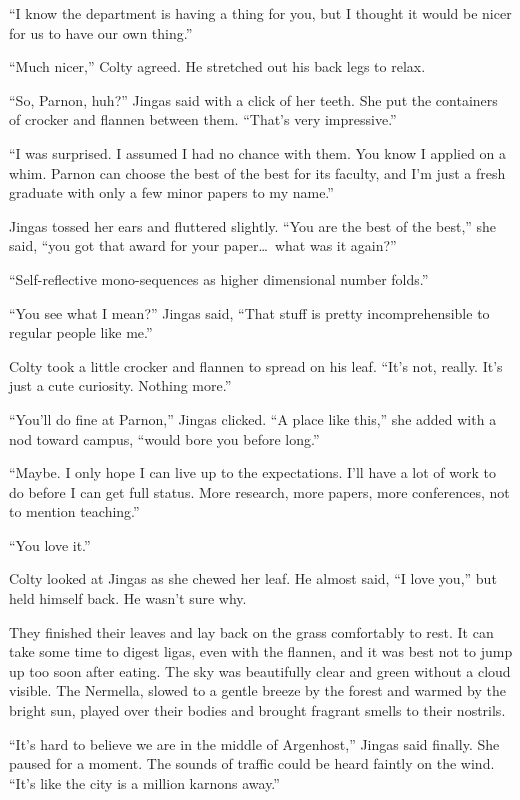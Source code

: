 ``I know the department is having a thing for you, but I thought it would be nicer for us to
have our own thing.''

``Much nicer,'' Colty agreed. He stretched out his back legs to relax.

``So, Parnon, huh?'' Jingas said with a click of her teeth. She put the containers of crocker
and flannen between them. ``That's very impressive.''

``I was surprised. I assumed I had no chance with them. You know I applied on a whim. Parnon can
choose the best of the best for its faculty, and I'm just a fresh graduate with only a few minor
papers to my name.''

Jingas tossed her ears and fluttered slightly. ``You are the best of the best,'' she said, ``you
got that award for your paper\ldots\ what was it again?''

``Self-reflective mono-sequences as higher dimensional number folds.''

``You see what I mean?'' Jingas said, ``That stuff is pretty incomprehensible to regular people
like me.''

Colty took a little crocker and flannen to spread on his leaf. ``It's not, really. It's just a
cute curiosity. Nothing more.''

``You'll do fine at Parnon,'' Jingas clicked. ``A place like this,'' she added with a nod toward
campus, ``would bore you before long.''

``Maybe. I only hope I can live up to the expectations. I'll have a lot of work to do before I
can get full status. More research, more papers, more conferences, not to mention teaching.''

``You love it.''

Colty looked at Jingas as she chewed her leaf. He almost said, ``I love you,'' but held himself
back. He wasn't sure why.

They finished their leaves and lay back on the grass comfortably to rest. It can take some time
to digest ligas, even with the flannen, and it was best not to jump up too soon after eating.
The sky was beautifully clear and green without a cloud visible. The Nermella, slowed to a
gentle breeze by the forest and warmed by the bright sun, played over their bodies and brought
fragrant smells to their nostrils.

``It's hard to believe we are in the middle of Argenhost,'' Jingas said finally. She paused for
a moment. The sounds of traffic could be heard faintly on the wind. ``It's like the city is a
million karnons away.''

